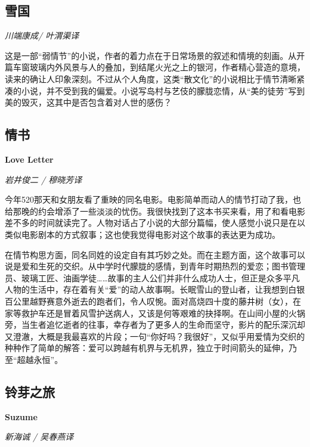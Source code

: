 \subsection*{雪国}
\par \emph{川端康成/ 叶渭渠译}
\par 这是一部“弱情节”的小说，作者的着力点在于日常场景的叙述和情境的刻画。从开篇车窗玻璃内外风景与人的叠加，到结尾火光之上的银河，作者精心营造的意境，读来的确让人印象深刻。不过从个人角度，这类“散文化”的小说相比于情节清晰紧凑的小说，并不受到我的偏爱。小说写岛村与艺伎的朦胧恋情，从“美的徒劳”写到美的毁灭，这其中是否包含着对人世的感伤？
\par {}

\subsection*{情书}
\par \textbf{Love Letter}
\par \emph{岩井俊二 /  穆晓芳译}
\par 今年520那天和女朋友看了重映的同名电影。电影简单而动人的情节打动了我，也给那晚的约会增添了一些淡淡的忧伤。我很快找到了这本书买来看，用了和看电影差不多的时间就读完了。人物对话占了小说的大部分篇幅，使人感觉小说只是在以类似电影剧本的方式叙事；这也使我觉得电影对这个故事的表达更为成功。
\par 在情节构思方面，同名同姓的设定自有其巧妙之处。而在主题方面，这个故事可以说是爱和生死的交织。从中学时代朦胧的感情，到青年时期热烈的爱恋；图书管理员、玻璃工匠、油画学徒……故事的主人公们并非什么成功人士，但正是众多平凡人物的生活中，存在着有关“爱”的动人故事啊。长眠雪山的登山者，让我想到白银百公里越野赛意外逝去的跑者们，令人叹惋。面对高烧四十度的藤井树（女），在家等救护车还是冒着风雪护送病人，又该是何等艰难的抉择啊。在山间小屋的火锅旁，当生者追忆逝者的往事，幸存者为了更多人的生命而坚守，影片的配乐深沉却又澄澈，大概是我最喜欢的片段；一句“你好吗？我很好”，又似乎用爱情为交织的种种作了简单的解答：爱可以跨越有机界与无机界，独立于时间箭头的延伸，乃至“超越永恒”。
\par {}

\subsection*{铃芽之旅}
\par \textbf{Suzume}
\par \emph{新海诚 / 吴春燕译}

